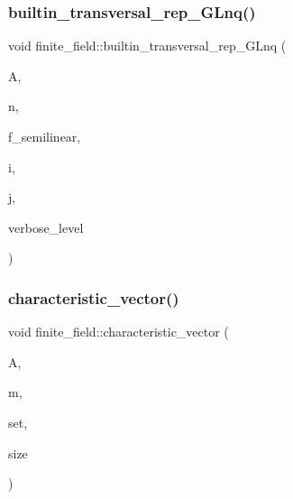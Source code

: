 \mbox{\label{classfinite__field_a65e29e1d5f070d2bb5cca74ead453a35}} 
\subsubsection{\texorpdfstring{builtin\+\_\+transversal\+\_\+rep\+\_\+\+G\+Lnq()}{builtin\_transversal\_rep\_GLnq()}}
{\footnotesize\ttfamily void finite\+\_\+field\+::builtin\+\_\+transversal\+\_\+rep\+\_\+\+G\+Lnq (\begin{DoxyParamCaption}\item[{\mbox{\hyperlink{galois_8h_a09fddde158a3a20bd2dcadb609de11dc}{I\+NT}} $\ast$}]{A,  }\item[{\mbox{\hyperlink{galois_8h_a09fddde158a3a20bd2dcadb609de11dc}{I\+NT}}}]{n,  }\item[{\mbox{\hyperlink{galois_8h_a09fddde158a3a20bd2dcadb609de11dc}{I\+NT}}}]{f\+\_\+semilinear,  }\item[{\mbox{\hyperlink{galois_8h_a09fddde158a3a20bd2dcadb609de11dc}{I\+NT}}}]{i,  }\item[{\mbox{\hyperlink{galois_8h_a09fddde158a3a20bd2dcadb609de11dc}{I\+NT}}}]{j,  }\item[{\mbox{\hyperlink{galois_8h_a09fddde158a3a20bd2dcadb609de11dc}{I\+NT}}}]{verbose\+\_\+level }\end{DoxyParamCaption})}

\mbox{\label{classfinite__field_a2ef51dbed7d99006459c0e6eb1204004}} 
\subsubsection{\texorpdfstring{characteristic\+\_\+vector()}{characteristic\_vector()}}
{\footnotesize\ttfamily void finite\+\_\+field\+::characteristic\+\_\+vector (\begin{DoxyParamCaption}\item[{\mbox{\hyperlink{galois_8h_a09fddde158a3a20bd2dcadb609de11dc}{I\+NT}} $\ast$}]{A,  }\item[{\mbox{\hyperlink{galois_8h_a09fddde158a3a20bd2dcadb609de11dc}{I\+NT}}}]{m,  }\item[{\mbox{\hyperlink{galois_8h_a09fddde158a3a20bd2dcadb609de11dc}{I\+NT}} $\ast$}]{set,  }\item[{\mbox{\hyperlink{galois_8h_a09fddde158a3a20bd2dcadb609de11dc}{I\+NT}}}]{size }\end{DoxyParamCaption})}


